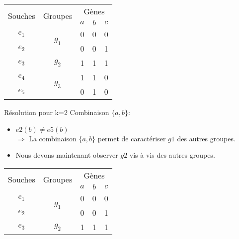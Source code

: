 \begin{overprint}
{\begin{minipage}[l]{0.46\linewidth}
\begin{center}
\begin{tabular}{|c||c|c|c|c|}
						\hline
						\multirow{2}{*}{Souches}&\multirow{2}{*}{Groupes}&\multicolumn{3}{c|}{Gènes
						}\\
						&&\cellcolor{blue!75}$a$&\cellcolor{blue!75}$b$&$c$\\
						\hline
						\hline
						$e_1$&\multirow{2}{*}{$g_1$}& 0 & 0 & 0\\
						\cline{1-1} \cline{3-5}
						$e_2$&& 0 & \cellcolor{cyan}0 & 1\\
						\hline
						\hline
						$e_3$&$g_2$& 1 & 1 & 1\\
						\hline
						\hline
						$e_4$&\multirow{2}{*}{$g_3$}& 1 & 1 & 0\\
						\cline{1-1} \cline{3-5}
						$e_5$&& 0 & \cellcolor{cyan}1 & 0\\
						\hline
					\end{tabular}
				\end{center}
			\end{minipage}
			\hspace{0.6cm}
			\begin{minipage}[r]{0.46\linewidth}
				\begin{block}{Résolution pour k=2}
					Combinaison $\{a,b\}$:
					\begin{itemize}
						\item $e2(b) \not = e5(b) $ \\ $\Rightarrow$ La combinaison $\{a,b\}$ permet de caractériser $g1$ des autres groupes.
						\item<16> Nous devons maintenant observer $g2$ vis à vis des autres groupes.
					\end{itemize}
				\end{block}
			\end{minipage}
		}
		\only<17>
		{
			\begin{minipage}[l]{0.46\linewidth}
				\begin{center}
					\begin{tabular}{|c||c|c|c|c|}
						\hline
						\multirow{2}{*}{Souches}&\multirow{2}{*}{Groupes}&\multicolumn{3}{c|}{Gènes
						}\\
						&&\cellcolor{blue!75}$a$&\cellcolor{blue!75}$b$&$c$\\
						\hline
						\hline
						$e_1$&\multirow{2}{*}{$g_1$}& 0 & 0 & 0\\
						\cline{1-1} \cline{3-5}
						$e_2$&& 0 & 0 & 1\\
						\hline
						\hline
						$e_3$&$g_2$& \cellcolor{cyan}1 & 1 & 1\\
						\hline

\end{tabular}
\end{center}
\end{minipage}}
\end{overprint}
